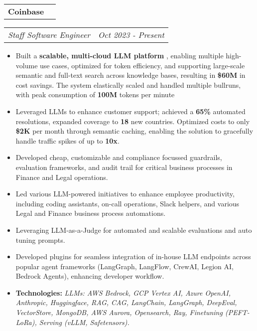 \documentclass[a4paper,11pt]{article}
\makeatletter
\newcommand{\resitem}[1]{\item #1}
\newcommand{\resCompany}[1]{
    \begin{tabular*}{\textwidth}{l @{\extracolsep{\fill}} r}
    \large \textbf{#1}
  \end{tabular*}
}
\newcommand{\resPosition}[2]{
    \begin{tabular*}{\textwidth}{l @{\extracolsep{\fill}} r}
        \textit{#1} & \textit{#2}
    \end{tabular*}
}
\makeatother
\begin{document}
    
    \indent \resCompany{Coinbase}
        \indent \resPosition{Staff Software Engineer}{Oct 2023 - Present}
        \begin{itemize}[leftmargin=30pt, rightmargin=-16pt, itemsep=-2pt]
            \resitem{Built a \textbf{scalable, multi-cloud LLM platform} , enabling multiple high-volume use cases, optimized for token efficiency, and supporting large-scale semantic and full-text search across knowledge bases, resulting in \textbf{\$60M} in cost savings. The system elastically scaled and handled multiple bullruns, with peak consumption of \textbf{100M} tokens per minute}

            \resitem{Leveraged LLMs to enhance customer support; achieved a \textbf{65\%} automated resolutions, expanded coverage to \textbf{18} new countries. Optimized costs to only \textbf{\$2K} per month through semantic caching, enabling the solution to gracefully handle traffic spikes of up to \textbf{10x}.}
            
            \resitem{Developed cheap, customizable and compliance focussed guardrails, evaluation frameworks, and audit trail for critical business processes in Finance and Legal operations.}  
        
            \resitem{Led various LLM-powered initiatives to enhance employee productivity, including coding assistants, on-call operations, Slack helpers, and various Legal and Finance business process automations.}

            \resitem{Leveraging LLM-as-a-Judge for automated and scalable evaluations and auto tuning prompts.}

            \resitem{Developed plugins for seamless integration of in-house LLM endpoints across popular agent frameworks (LangGraph, LangFlow, CrewAI, Legion AI, Bedrock Agents), enhancing developer workflow.}
        
            \resitem{\textbf{Technologies:} \textit{LLMs: AWS Bedrock, GCP Vertex AI, Azure OpenAI, Anthropic, Huggingface, RAG, CAG, LangChain, LangGraph, DeepEval, VectorStore, MongoDB, AWS Aurora, Opensearch, Ray, Finetuning (PEFT-LoRa), Serving (vLLM, Safetensors).}}
            
        \end{itemize}

\end{document}
